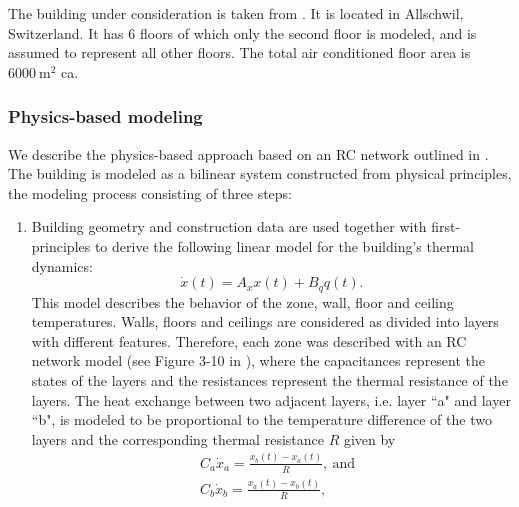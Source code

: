 The building under consideration is taken from \cite{Sturzenegger2016}. It is located in Allschwil, Switzerland. It has 6 floors of which only the second floor is modeled, and is assumed to represent all other floors. The total air conditioned floor area is $6000\ \mathrm{m^2}$ ca.

\subsubsection{Physics-based modeling}
\label{SSS:physics-based}
We describe the physics-based approach based on an RC network outlined in \cite{Sturzenegger2016}.
The building is modeled as a bilinear system constructed from physical principles, the modeling process consisting of three steps:
\begin{enumerate}
	\item Building geometry and construction data are used together with first-principles to derive the following linear model for the building's thermal dynamics:
		\begin{equation}\label{E:RCZoneEq}
			\dot x(t) = A_x x(t) + B_q q(t).
		\end{equation}
		This model describes the behavior of the zone, wall, floor and ceiling temperatures.
		Walls, floors and ceilings are considered as divided into layers with different features. Therefore, each zone was described with an RC network model (see Figure 3-10 in \cite{SturzeneggerTR}), where the capacitances represent the states of the layers and the resistances represent the thermal resistance of the layers.
		The heat exchange between two adjacent layers, i.e. layer ``a" and layer ``b", is modeled to be proportional to the temperature difference of the two layers and the corresponding thermal resistance $R$ given by
		\begin{equation}\label{E:RCHeatExchange}
			\begin{aligned}
				&C_a\dot x_a = \frac{x_b(t) - x_a(t)}{R}, \ \text{and}\\
				&C_b\dot x_b =  \frac{x_a(t) - x_b(t)}{R},
			\end{aligned}
		\end{equation}

\end{enumerate}
